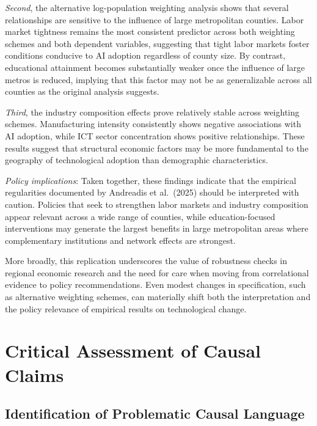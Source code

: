 \documentclass[
]{article}
\begin{document}
\emph{Second}, the alternative log-population weighting analysis shows
that several relationships are sensitive to the influence of large
metropolitan counties. Labor market tightness remains the most
consistent predictor across both weighting schemes and both dependent
variables, suggesting that tight labor markets foster conditions
conducive to AI adoption regardless of county size. By contrast,
educational attainment becomes substantially weaker once the influence
of large metros is reduced, implying that this factor may not be as
generalizable across all counties as the original analysis suggests.

\emph{Third}, the industry composition effects prove relatively stable
across weighting schemes. Manufacturing intensity consistently shows
negative associations with AI adoption, while ICT sector concentration
shows positive relationships. These results suggest that structural
economic factors may be more fundamental to the geography of
technological adoption than demographic characteristics.

\emph{Policy implications}: Taken together, these findings indicate that
the empirical regularities documented by Andreadis et al.~(2025) should
be interpreted with caution. Policies that seek to strengthen labor
markets and industry composition appear relevant across a wide range of
counties, while education-focused interventions may generate the largest
benefits in large metropolitan areas where complementary institutions
and network effects are strongest.

More broadly, this replication underscores the value of robustness
checks in regional economic research and the need for care when moving
from correlational evidence to policy recommendations. Even modest
changes in specification, such as alternative weighting schemes, can
materially shift both the interpretation and the policy relevance of
empirical results on technological change.

\section{Critical Assessment of Causal
Claims}\label{critical-assessment-of-causal-claims}

\subsection{Identification of Problematic Causal
Language}\label{identification-of-problematic-causal-language}
\end{document}
